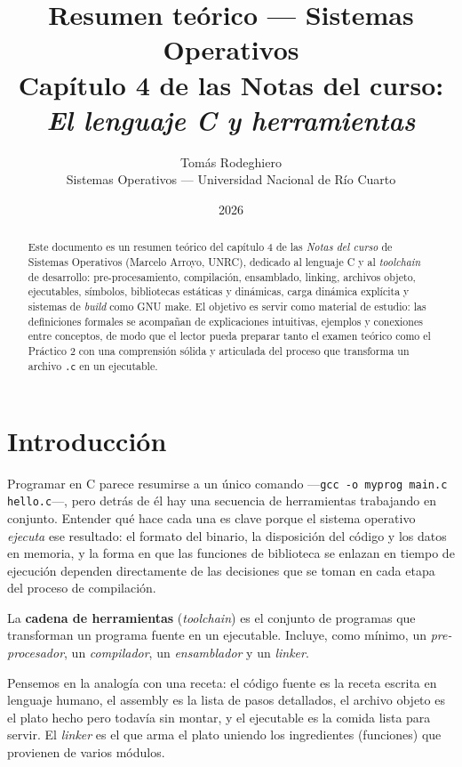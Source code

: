 \documentclass[11pt,a4paper]{article}
\title{
    \vspace{-2.5em}
    \textbf{Resumen teórico --- Sistemas Operativos} \\[0.3em]
    \large Capítulo 4 de las Notas del curso: \emph{El lenguaje C y herramientas}
}
\author{
    Tomás Rodeghiero \\
    \small Sistemas Operativos --- Universidad Nacional de Río Cuarto
}
\date{2026}
\begin{document}
\maketitle

\begin{abstract}
\noindent
Este documento es un resumen teórico del capítulo 4 de las
\emph{Notas del curso} de Sistemas Operativos (Marcelo Arroyo,
UNRC), dedicado al lenguaje C y al \emph{toolchain} de
desarrollo: pre-procesamiento, compilación, ensamblado, linking,
archivos objeto, ejecutables, símbolos, bibliotecas estáticas y
dinámicas, carga dinámica explícita y sistemas de \emph{build} como
GNU make. El objetivo es servir como material de estudio: las
definiciones formales se acompañan de explicaciones intuitivas,
ejemplos y conexiones entre conceptos, de modo que el lector pueda
preparar tanto el examen teórico como el Práctico 2 con una
comprensión sólida y articulada del proceso que transforma un
archivo \texttt{.c} en un ejecutable.
\end{abstract}

\tableofcontents
\bigskip

\section{Introducción}

Programar en C parece resumirse a un único comando ---\texttt{gcc -o
myprog main.c hello.c}---, pero detrás de él hay una secuencia de
herramientas trabajando en conjunto. Entender qué hace cada una es
clave porque el sistema operativo \emph{ejecuta} ese resultado: el
formato del binario, la disposición del código y los datos en
memoria, y la forma en que las funciones de biblioteca se enlazan en
tiempo de ejecución dependen directamente de las decisiones que se
toman en cada etapa del proceso de compilación.

\begin{definicion}
La \textbf{cadena de herramientas} (\emph{toolchain}) es el conjunto
de programas que transforman un programa fuente en un ejecutable.
Incluye, como mínimo, un \emph{pre-procesador}, un \emph{compilador},
un \emph{ensamblador} y un \emph{linker}.
\end{definicion}

\begin{idea}
Pensemos en la analogía con una receta: el código fuente es la receta
escrita en lenguaje humano, el assembly es la lista de pasos
detallados, el archivo objeto es el plato hecho pero todavía sin
montar, y el ejecutable es la comida lista para servir. El
\emph{linker} es el que arma el plato uniendo los ingredientes
(funciones) que provienen de varios módulos.
\end{idea}
\end{document}
